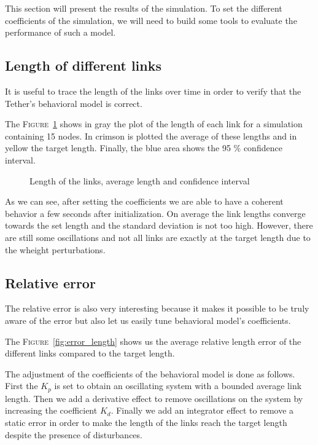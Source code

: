 This section will present the results of the simulation. To set the different coefficients of the simulation, we will need to build some tools to evaluate the performance of such a model.

\subsection{Length of different links}

It is useful to trace the length of the links over time in order to verify that the Tether's behavioral model is correct.

The \textsc{Figure}~\ref{fig:length} shows in gray the plot of the length of each link for a simulation containing 15 nodes. In crimson is plotted the average of these lengths and in yellow the target length. Finally, the blue area shows the 95 \% confidence interval.

\begin{figure}[!htb]
    \centering
    
    \caption{Length of the links, average length and confidence interval}
    \label{fig:length}
\end{figure}

As we can see, after setting the coefficients we are able to have a coherent behavior a few seconds after initialization. On average the link lengths converge towards the set length and the standard deviation is not too high. However, there are still some oscillations and not all links are exactly at the target length due to the wheight perturbations.

\subsection{Relative error}
The relative error is also very interesting because it makes it possible to be truly aware of the error but also let us easily tune behavioral model's coefficients.

The \textsc{Figure}~\ref{fig:error_length} shows us the average relative length error of the different links compared to the target length.

The adjustment of the coefficients of the behavioral model is done as follows. First the $K_p$ is set to obtain an oscillating system with a bounded average link length. Then we add a derivative effect to remove oscillations on the system by increasing the coefficient $K_d$. Finally we add an integrator effect to remove a static error in order to make the length of the links reach the target length despite the presence of disturbances.

